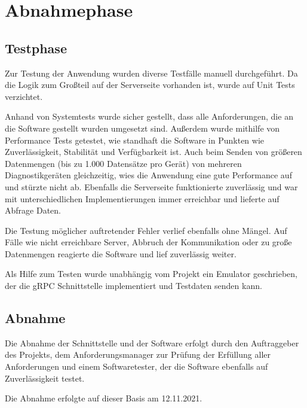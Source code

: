 \section{Abnahmephase}
\label{sec:Abnahmephase}

\subsection{Testphase}
\label{sec:Testphase}
Zur Testung der Anwendung wurden diverse Testfälle manuell durchgeführt. Da die Logik zum Großteil auf der Serverseite vorhanden ist, wurde auf Unit Tests verzichtet.

Anhand von Systemtests wurde sicher gestellt, dass alle Anforderungen, die an die Software gestellt wurden umgesetzt sind. Außerdem wurde mithilfe von Performance Tests getestet, wie standhaft die Software in Punkten wie Zuverlässigkeit, Stabilität und Verfügbarkeit ist. Auch beim Senden von größeren Datenmengen (bis zu 1.000 Datensätze pro Gerät) von mehreren Diagnostikgeräten gleichzeitig, wies die Anwendung eine gute Performance auf und stürzte nicht ab. Ebenfalls die Serverseite funktionierte zuverlässig und war mit unterschiedlichen  Implementierungen immer erreichbar und lieferte auf Abfrage Daten.

Die Testung möglicher auftretender Fehler verlief ebenfalls ohne Mängel. Auf Fälle wie nicht erreichbare Server, Abbruch der Kommunikation oder zu große Datenmengen reagierte die Software und lief zuverlässig weiter.

Als Hilfe zum Testen wurde unabhängig vom Projekt ein Emulator geschrieben, der die {\acs{gRPC}} Schnittstelle implementiert und Testdaten senden kann.

\subsection{Abnahme}
\label{sec:Abnahme}
Die Abnahme der Schnittstelle und der Software erfolgt durch den Auftraggeber des Projekts, dem Anforderungsmanager zur Prüfung der Erfüllung aller Anforderungen und einem Softwaretester, der die Software ebenfalls auf Zuverlässigkeit testet.

Die Abnahme erfolgte auf dieser Basis am 12.11.2021.